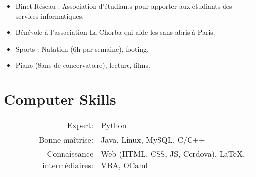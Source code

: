 \documentclass[a4paper,10pt]{article} %
\begin{document}
\begin{itemize}[noitemsep]
  \item Binet Réseau : Association d'étudiants pour apporter aux étudiants des services informatiques.
  \item Bénévole à l'association La Chorba qui aide les sans-abris à Paris.
  \item Sports : Natation (6h par semaine), footing.
  \item Piano (8ans de concervatoire), lecture, films.
\end{itemize}



\section{Computer Skills}

\begin{tabular}{rl}
  Expert: & Python\\
  Bonne maîtrise: & Java, Linux, MySQL, C/C++\\
  Connaissance intermédiaires: & Web (HTML, CSS, JS, Cordova), \LaTeX, VBA, OCaml
\end{tabular}
\end{document}
